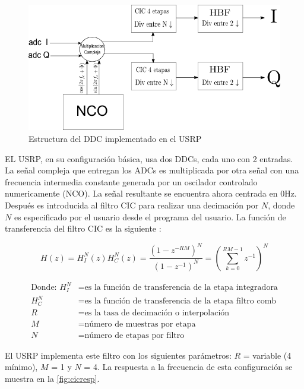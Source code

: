 \begin{figure}[htp]
\centering
	\includegraphics[width=5.5in]{figs/ddc}
	\vspace{0.3in}
	\caption{Estructura del DDC implementado en el USRP}
	\label{fig:ddcblock}
\end{figure}

EL USRP, en su configuraci\'on b\'asica, usa dos DDCs, cada uno con 2
entradas. La se\~nal compleja que entregan los ADCs es multiplicada por otra se\~nal con una
frecuencia intermedia constante generada por un oscilador controlado numericamente (NCO).  La
se\~nal resultante se encuentra ahora centrada en 0Hz. Despu\'es es introducida al filtro CIC para
realizar una decimaci\'on por $N$, donde $N$ es especificado por el usuario desde el programa
del usuario. La funci\'on de transferencia del filtro CIC es la siguiente
\cite{cic}:

\begin{equation}
H(z)=H_I^N(z)H_C^N(z)=\frac{(1-z^{-RM})^N}{(1-z^{-1})^N}=\left(\sum_{k=0}^{RM-1}z^{-1}\right)^N
\end{equation}

\begin{equation*}
\begin{aligned}
\text{Donde: }H_I^N&=\text{es la funci\'on de transferencia de la etapa
integradora}\\
H_C^N&=\text{es la funci\'on de transferencia de la etapa filtro comb}\\
R&=\text{es la tasa de decimaci\'on o interpolaci\'on}\\
M&=\text{n\'umero de muestras por etapa}\\
N&=\text{n\'umero de etapas por filtro}
\end{aligned}
\end{equation*}

El USRP implementa este filtro con los siguientes par\'ametros: $R$ = variable (4 m\'inimo), $M$ = 1
y $N$ = 4. La respuesta a la frecuencia de esta configuraci\'on se muestra en la
\ref{fig:cicresp}.

